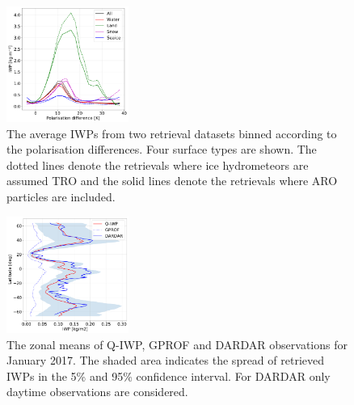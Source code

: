 \documentclass[amt, manuscript]{copernicus}
\begin{document}
\begin{figure}[t]
	\includegraphics[width=4cm]{Figures/IWP_PD_GMI.pdf}
	\caption{ The average IWPs  from two retrieval datasets binned according to the polarisation differences. Four surface types are shown. The dotted lines denote the retrievals where ice hydrometeors are assumed TRO and the solid lines denote the retrievals where ARO particles are included. }
	\label{fig:IWP_PD_GMI}
\end{figure}



\begin{figure}[t]
	\includegraphics[width=4cm]{Figures/zonal_mean_jan_2017.pdf}
	\caption{ The zonal means of Q-IWP, GPROF and DARDAR observations for January 2017. The shaded area indicates the spread of retrieved IWPs in the 5\% and 95\% confidence interval. For DARDAR only daytime observations are considered.  }
	\label{fig:zonal_mean_GMI_17}
\end{figure}

\end{document}
